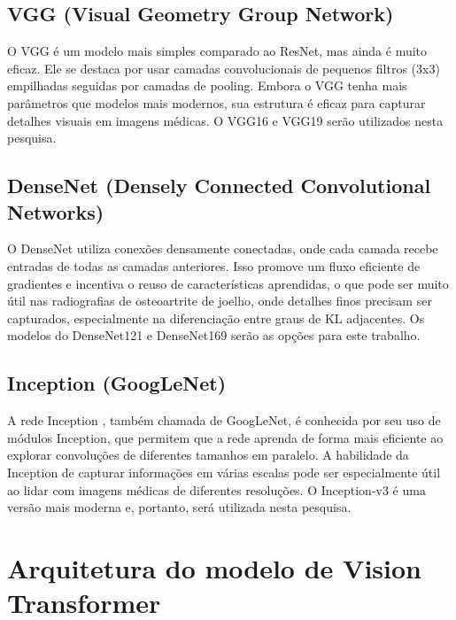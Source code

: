 \subsection{VGG (Visual Geometry Group Network)}

O VGG \cite{Simonyan2015} é um modelo mais simples comparado ao ResNet, mas ainda é muito eficaz. Ele se destaca por usar camadas convolucionais de pequenos filtros (3x3) empilhadas seguidas por camadas de pooling. Embora o VGG tenha mais parâmetros que modelos mais modernos, sua estrutura é eficaz para capturar detalhes visuais em imagens médicas. O VGG16 e VGG19 serão utilizados nesta pesquisa.

\subsection{DenseNet (Densely Connected Convolutional Networks)}

O DenseNet \cite{Huang2017} utiliza conexões densamente conectadas, onde cada camada recebe entradas de todas as camadas anteriores. Isso promove um fluxo eficiente de gradientes e incentiva o reuso de características aprendidas, o que pode ser muito útil nas radiografias de osteoartrite de joelho, onde detalhes finos precisam ser capturados, especialmente na diferenciação entre graus de KL adjacentes. Os modelos do DenseNet121 e DenseNet169 serão as opções para este trabalho.

\subsection{Inception (GoogLeNet)}

A rede Inception \cite{Szegedy2016}, também chamada de GoogLeNet, é conhecida por seu uso de módulos Inception, que permitem que a rede aprenda de forma mais eficiente ao explorar convoluções de diferentes tamanhos em paralelo. A habilidade da Inception de capturar informações em várias escalas pode ser especialmente útil ao lidar com imagens médicas de diferentes resoluções. O Inception-v3 é uma versão mais moderna e, portanto, será utilizada nesta pesquisa.

\section{Arquitetura do modelo de Vision Transformer}

